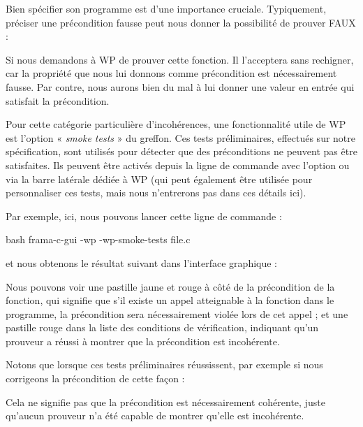 

Bien spécifier son programme est d'une importance cruciale. Typiquement,
préciser une précondition fausse peut nous donner la possibilité de prouver
FAUX :




Si nous demandons à WP de prouver cette fonction. Il l'acceptera sans rechigner,
car la propriété que nous lui donnons comme précondition est nécessairement fausse.
Par contre, nous aurons bien du mal à lui donner une valeur en entrée qui satisfait
la précondition.


Pour cette catégorie particulière d'incohérences, une fonctionnalité utile de WP
est l'option « \textit{smoke tests} » du greffon. Ces tests préliminaires, effectués
sur notre spécification, sont utilisés pour détecter que des préconditions ne peuvent
pas être satisfaites. Ils peuvent être activés depuis la ligne de commande avec
l'option  ou via la barre latérale dédiée à WP (qui
peut également être utilisée pour personnaliser ces tests, mais nous n'entrerons
pas dans ces détails ici).




Par exemple, ici, nous pouvons lancer cette ligne de commande :


\begin{CodeBlock}{bash}
  frama-c-gui -wp -wp-smoke-tests file.c
\end{CodeBlock}


et nous obtenons le résultat suivant dans l'interface graphique :




Nous pouvons voir une pastille jaune et rouge à côté de la précondition de la
fonction, qui signifie que s'il existe un appel atteignable à la fonction dans
le programme, la précondition sera nécessairement violée lors de cet appel ; et
une pastille rouge dans la liste des conditions de vérification, indiquant qu'un
prouveur a réussi à montrer que la précondition est incohérente.


Notons que lorsque ces tests préliminaires réussissent, par exemple si
nous corrigeons la précondition de cette façon :




Cela ne signifie pas que la précondition est nécessairement cohérente, juste
qu'aucun prouveur n'a été capable de montrer qu'elle est incohérente.


